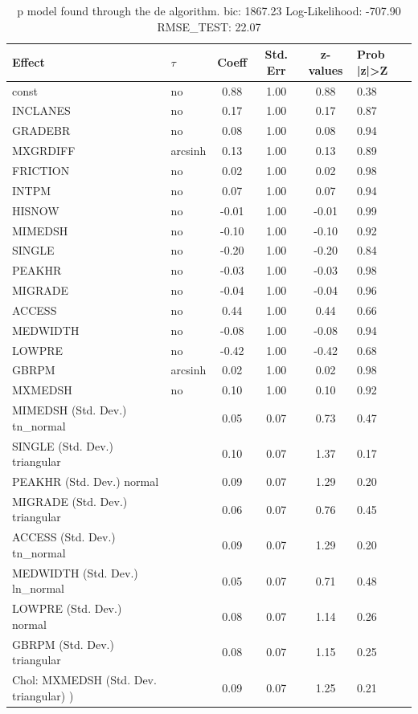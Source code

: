 \begin{table}
	\caption{p model found through the de algorithm. bic: 1867.23 Log-Likelihood: -707.90 RMSE_TEST: 22.07}
	\begin{center}
		\begin{tabular}{|l|l|c|c|c|l|}
			\hline
			Effect & $\tau$ & Coeff & Std. Err & z-values & Prob |z|>Z \\
			\hline
			const & no & 0.88 & 1.00 & 0.88 & 0.38 \\
			\hline
			INCLANES & no & 0.17 & 1.00 & 0.17 & 0.87 \\
			\hline
			GRADEBR & no & 0.08 & 1.00 & 0.08 & 0.94 \\
			\hline
			MXGRDIFF & arcsinh & 0.13 & 1.00 & 0.13 & 0.89 \\
			\hline
			FRICTION & no & 0.02 & 1.00 & 0.02 & 0.98 \\
			\hline
			INTPM & no & 0.07 & 1.00 & 0.07 & 0.94 \\
			\hline
			HISNOW & no & -0.01 & 1.00 & -0.01 & 0.99 \\
			\hline
			MIMEDSH & no & -0.10 & 1.00 & -0.10 & 0.92 \\
			\hline
			SINGLE & no & -0.20 & 1.00 & -0.20 & 0.84 \\
			\hline
			PEAKHR & no & -0.03 & 1.00 & -0.03 & 0.98 \\
			\hline
			MIGRADE & no & -0.04 & 1.00 & -0.04 & 0.96 \\
			\hline
			ACCESS & no & 0.44 & 1.00 & 0.44 & 0.66 \\
			\hline
			MEDWIDTH & no & -0.08 & 1.00 & -0.08 & 0.94 \\
			\hline
			LOWPRE & no & -0.42 & 1.00 & -0.42 & 0.68 \\
			\hline
			GBRPM & arcsinh & 0.02 & 1.00 & 0.02 & 0.98 \\
			\hline
			MXMEDSH & no & 0.10 & 1.00 & 0.10 & 0.92 \\
			\hline
			MIMEDSH (Std. Dev.) tn_normal &  & 0.05 & 0.07 & 0.73 & 0.47 \\
			\hline
			SINGLE (Std. Dev.) triangular &  & 0.10 & 0.07 & 1.37 & 0.17 \\
			\hline
			PEAKHR (Std. Dev.) normal &  & 0.09 & 0.07 & 1.29 & 0.20 \\
			\hline
			MIGRADE (Std. Dev.) triangular &  & 0.06 & 0.07 & 0.76 & 0.45 \\
			\hline
			ACCESS (Std. Dev.) tn_normal &  & 0.09 & 0.07 & 1.29 & 0.20 \\
			\hline
			MEDWIDTH (Std. Dev.) ln_normal &  & 0.05 & 0.07 & 0.71 & 0.48 \\
			\hline
			LOWPRE (Std. Dev.) normal &  & 0.08 & 0.07 & 1.14 & 0.26 \\
			\hline
			GBRPM (Std. Dev.) triangular &  & 0.08 & 0.07 & 1.15 & 0.25 \\
			\hline
			 Chol: MXMEDSH (Std. Dev. triangular) ) &  & 0.09 & 0.07 & 1.25 & 0.21 \\
			\hline
		\end{tabular}
	\end{center}
\end{table}